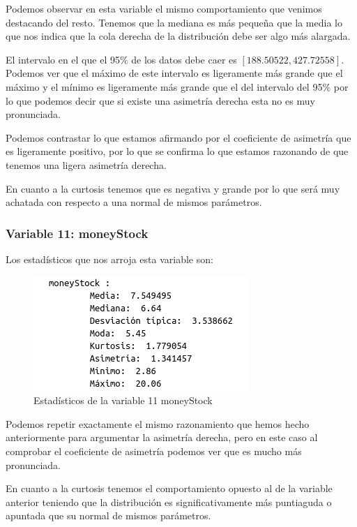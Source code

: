 \documentclass[12pt,a4paper]{article}
\begin{document}
Podemos observar en esta variable el mismo comportamiento que venimos destacando del resto. Tenemos que la mediana es más pequeña que la media lo que nos indica que la cola derecha de la distribución debe ser algo más alargada.

El intervalo en el que el 95\% de los datos debe caer es $[188.50522, 427.72558]$. Podemos ver que el máximo de este intervalo es ligeramente más grande que el máximo y el mínimo es ligeramente más grande que el del intervalo del 95\% por lo que podemos decir que si existe una asimetría derecha esta no es muy pronunciada.

Podemos contrastar lo que estamos afirmando por el coeficiente de asimetría que es ligeramente positivo, por lo que se confirma lo que estamos razonando de que tenemos una ligera asimetría derecha.

En cuanto a la curtosis tenemos que es negativa y grande por lo que será muy achatada con respecto a una normal de mismos parámetros.

\subsubsection*{Variable 11: moneyStock}

Los estadísticos que nos arroja esta variable son:

\begin{figure}[H]
	\centering
	\includegraphics[scale=0.7]{./Imagenes/estadisticos_moneyStock.png}
	\caption{Estadísticos de la variable 11 moneyStock}
\end{figure}

Podemos repetir exactamente el mismo razonamiento que hemos hecho anteriormente para argumentar la asimetría derecha, pero en este caso al comprobar el coeficiente de asimetría podemos ver que es mucho más pronunciada.

En cuanto a la curtosis tenemos el comportamiento opuesto al de la variable anterior teniendo que la distribución es significativamente más puntiaguda o apuntada que su normal de mismos parámetros.
\end{document}
